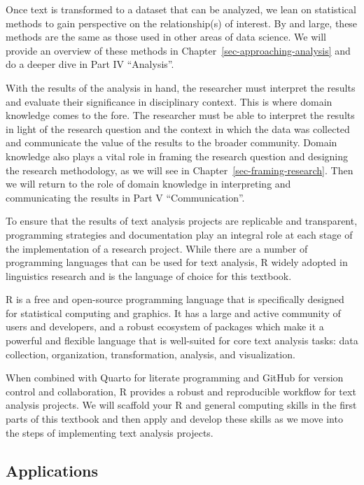 \documentclass[
  letterpaper,
  DIV=11,
  numbers=noendperiod]{scrreprt}
\theoremstyle{definition}
\theoremstyle{remark}
\begin{document}
Once text is transformed to a dataset that can be analyzed, we lean on
statistical methods to gain perspective on the relationship(s) of
interest. By and large, these methods are the same as those used in
other areas of data science. We will provide an overview of these
methods in Chapter~\ref{sec-approaching-analysis} and do a deeper dive
in Part IV ``Analysis''.

With the results of the analysis in hand, the researcher must interpret
the results and evaluate their significance in disciplinary context.
This is where domain knowledge comes to the fore. The researcher must be
able to interpret the results in light of the research question and the
context in which the data was collected and communicate the value of the
results to the broader community. Domain knowledge also plays a vital
role in framing the research question and designing the research
methodology, as we will see in Chapter~\ref{sec-framing-research}. Then
we will return to the role of domain knowledge in interpreting and
communicating the results in Part V ``Communication''.

To ensure that the results of text analysis projects are replicable and
transparent, programming strategies and documentation play an integral
role at each stage of the implementation of a research project. While
there are a number of programming languages that can be used for text
analysis, R widely adopted in linguistics research and is the language
of choice for this textbook.

R is a free and open-source programming language that is specifically
designed for statistical computing and graphics. It has a large and
active community of users and developers, and a robust ecosystem of
packages which make it a powerful and flexible language that is
well-suited for core text analysis tasks: data collection, organization,
transformation, analysis, and visualization.

When combined with Quarto for literate programming and GitHub for
version control and collaboration, R provides a robust and reproducible
workflow for text analysis projects. We will scaffold your R and general
computing skills in the first parts of this textbook and then apply and
develop these skills as we move into the steps of implementing text
analysis projects.

\subsection{Applications}\label{applications}
\end{document}
